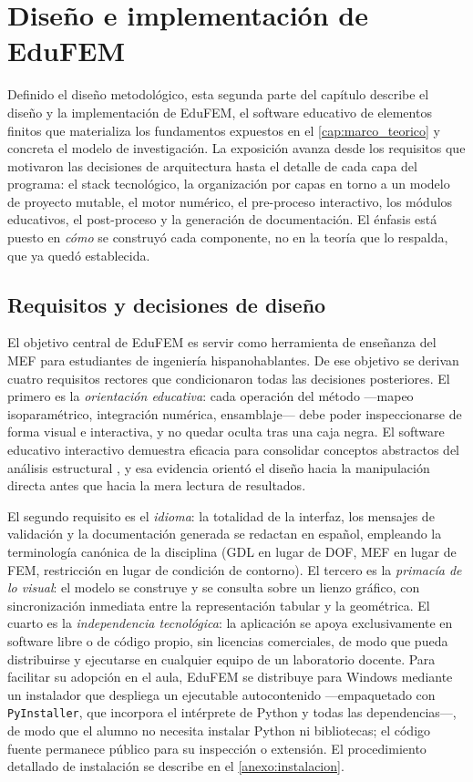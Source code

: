\section{Diseño e implementación de EduFEM}
\label{sec:diseno-edufem}

Definido el diseño metodológico, esta segunda parte del capítulo describe el diseño y la implementación de EduFEM, el software educativo de elementos finitos que materializa los fundamentos expuestos en el \autoref{cap:marco_teorico} y concreta el modelo de investigación. La exposición avanza desde los requisitos que motivaron las decisiones de arquitectura hasta el detalle de cada capa del programa: el stack tecnológico, la organización por capas en torno a un modelo de proyecto mutable, el motor numérico, el pre-proceso interactivo, los módulos educativos, el post-proceso y la generación de documentación. El énfasis está puesto en \emph{cómo} se construyó cada componente, no en la teoría que lo respalda, que ya quedó establecida.

\subsection{Requisitos y decisiones de diseño}
\label{sec:requisitos}

El objetivo central de EduFEM es servir como herramienta de enseñanza del MEF para estudiantes de ingeniería hispanohablantes. De ese objetivo se derivan cuatro requisitos rectores que condicionaron todas las decisiones posteriores. El primero es la \emph{orientación educativa}: cada operación del método —mapeo isoparamétrico, integración numérica, ensamblaje— debe poder inspeccionarse de forma visual e interactiva, y no quedar oculta tras una caja negra. El software educativo interactivo demuestra eficacia para consolidar conceptos abstractos del análisis estructural \autocite{lee2015interactive,bishay2020teaching,perezsantiago2023fem}, y esa evidencia orientó el diseño hacia la manipulación directa antes que hacia la mera lectura de resultados.

El segundo requisito es el \emph{idioma}: la totalidad de la interfaz, los mensajes de validación y la documentación generada se redactan en español, empleando la terminología canónica de la disciplina (GDL en lugar de DOF, MEF en lugar de FEM, restricción en lugar de condición de contorno). El tercero es la \emph{primacía de lo visual}: el modelo se construye y se consulta sobre un lienzo gráfico, con sincronización inmediata entre la representación tabular y la geométrica. El cuarto es la \emph{independencia tecnológica}: la aplicación se apoya exclusivamente en software libre o de código propio, sin licencias comerciales, de modo que pueda distribuirse y ejecutarse en cualquier equipo de un laboratorio docente. Para facilitar su adopción en el aula, EduFEM se distribuye para Windows mediante un instalador que despliega un ejecutable autocontenido —empaquetado con \texttt{PyInstaller}, que incorpora el intérprete de Python y todas las dependencias—, de modo que el alumno no necesita instalar Python ni bibliotecas; el código fuente permanece público para su inspección o extensión. El procedimiento detallado de instalación se describe en el \autoref{anexo:instalacion}.

